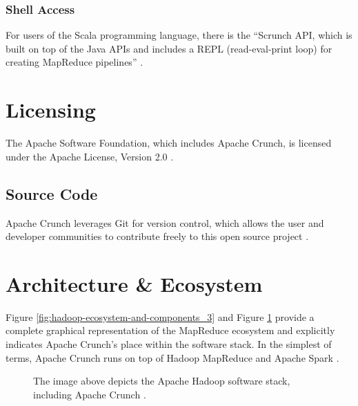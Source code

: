 \documentclass[9pt,twocolumn,twoside]{../../styles/osajnl}
\begin{document}
\subsubsection{Shell Access} \label{shell}
For users of the Scala programming language, there is the ``Scrunch
API, which is built on top of the Java APIs and includes a REPL
(read-eval-print loop) for creating MapReduce pipelines''
\cite{www-crunch-api}.

\section{Licensing} \label{licensing}
The Apache Software Foundation, which includes Apache Crunch, is
licensed under the Apache License, Version 2.0 \cite{www-apache-lic}.

\subsection{Source Code}\label{source}
Apache Crunch leverages Git for version control, which allows the user
and developer communities to contribute freely to this open source
project \cite{www-crunch-git}.

\section{Architecture \& Ecosystem} \label{ecosystem}
Figure \ref{fig:hadoop-ecosystem-and-components_3} and Figure
\ref{fig:architecture} provide a complete graphical representation of
the MapReduce ecosystem and explicitly indicates Apache Crunch's place
within the software stack. In the simplest of terms, Apache Crunch
runs on top of Hadoop MapReduce and Apache Spark
\cite{www-crunch-api}.

\begin{figure}[htbp]
\centering
{}
\caption{The image above depicts the Apache Hadoop software stack, including Apache Crunch \cite{www-crunch-architecture}.}
\label{fig:architecture}
\end{figure}
\end{document}
